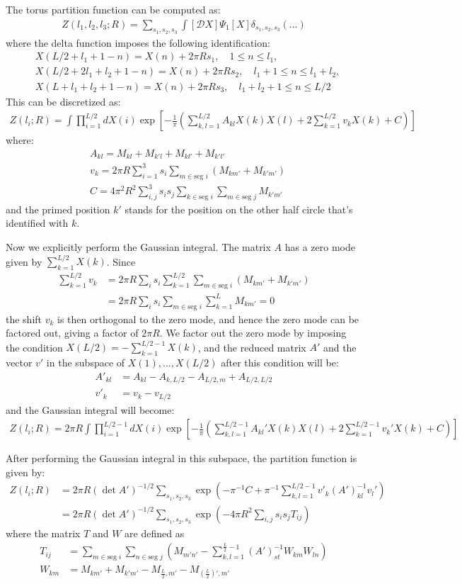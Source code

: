 \documentclass[12pt,letterpaper]{article}
\def\ie{\begin{equation}\begin{aligned}}
\def\fe{\end{aligned}\end{equation}}
\numberwithin{equation}{section}
\begin{document}
The torus partition function can be computed as:
\ie
Z(l_1,l_2,l_3;R)= \sum_{s_1, s_2, s_3} \int [\mathcal{D}X] \Psi_1[X] \delta_{s_1,s_2,s_3}(...)
\fe
where the delta function imposes the following identification:
\ie
& X(L/2+l_1+1-n)=X(n)+2\pi R s_1, \quad 1 \leq n \leq l_1, \\
& X(L/2+2 l_1+l_2+1-n)=X(n)+2\pi R s_2, \quad l_1+1 \leq n \leq l_1+l_2, \\
& X(L+l_1+l_2+1-n)=X(n)+2\pi R s_3, \quad l_1+l_2+1 \leq n \leq L/2
\fe
This can be discretized as:
\ie
Z(l_i;R)=\int \prod_{i=1}^{L/2}dX(i) \exp\left[-\frac{1}{\pi}\left(\sum_{k,l=1}^{L/2}A_{kl}X(k)X(l)+2\sum_{k=1}^{L/2}v_k X(k)+C\right)\right]
\fe
where:
\ie
& A_{kl}=M_{kl}+M_{k'l}+M_{kl'}+M_{k'l'}\\
& v_k=2\pi R\sum_{i=1}^3 s_i \sum_{m\in \text{seg }i}(M_{km'}+M_{k'm'})\\
& C=4\pi^2 R^2\sum_{i,j}^3 s_i s_j \sum_{k\in \text{seg }i}\sum_{m\in \text{seg }j}M_{k'm'}
\label{AvC}
\fe
and the primed position $k'$ stands for the position on the other half circle that's identified with $k$.

Now we explicitly perform the Gaussian integral. The matrix $A$ has a zero mode given by $\sum_{k=1}^{L/2}X(k)$. Since
\ie
\sum_{k=1}^{L/2}{v_k}&=2\pi R\sum_i s_i \sum_{k=1}^{L/2}\sum_{m\in \text{seg }i}(M_{km'}+M_{k'm'})\\
&=2\pi R\sum_i s_i \sum_{m\in \text{seg }i}\sum_{k=1}^L M_{km'}=0
\fe
the shift $v_k$ is then orthogonal to the zero mode, and hence the zero mode can be factored out, giving a factor of $2\pi R$. We factor out the zero mode by imposing the condition $X(L/2)=-\sum_{k=1}^{L/2-1}X(k)$, and the reduced matrix $A'$ and the vector $v'$ in the subspace of $X(1),...,X(L/2)$ after this condition will be:
\ie
A'_{kl}&=A_{kl}-A_{k,L/2}-A_{L/2,m}+A_{L/2,L/2}\\
v'_k&=v_k-v_{L/2}
\fe
and the Gaussian integral will become:
\ie
Z(l_i;R)=2\pi R\int \prod_{i=1}^{L/2-1} dX(i) \exp\left[-\frac{1}{\pi}\left(\sum_{k,l=1}^{L/2-1}A_{kl}'X(k)X(l)+2\sum_{k=1}^{L/2-1}v_k' X(k)+C\right)\right]
\fe

After performing the Gaussian integral in this subspace, the partition function is given by:
\ie
Z(l_i;R)&=2\pi R(\det A')^{-1/2}\sum_{s_1, s_2, s_3}\exp(-\pi^{-1}C+\pi^{-1}\sum_{k,l=1}^{L/2-1}v'_k (A')^{-1}_{kl} v_l')\\
&=2\pi R(\det A')^{-1/2}\sum_{s_1, s_2, s_3}\exp(-4\pi R^2\sum_{i,j}s_is_j T_{ij})
\fe
where the matrix $T$ and $W$ are defined as
\ie
T_{ij}&= \sum_{m\in \text{seg }i}\sum_{n\in \text{seg }j}\left(M_{m'n'}-\sum_{k,l=1}^{\frac{L}{2}-1}(A')^{-1}_{st}W_{km}W_{ln}\right)\\
W_{km}&=M_{km'}+M_{k'm'}-M_{\frac{L}{2},m'}-M_{(\frac{L}{2})',m'}
\fe
\end{document}
